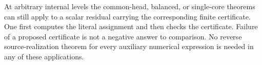 At arbitrary internal levels the common-head, balanced, or single-core
theorems can still apply to a scalar residual carrying the corresponding
finite certificate.  One first computes the literal assignment and then
checks the certificate.  Failure of a proposed certificate is not a
negative answer to comparison.  No reverse source-realization theorem
for every auxiliary numerical expression is needed in any of these
applications.
